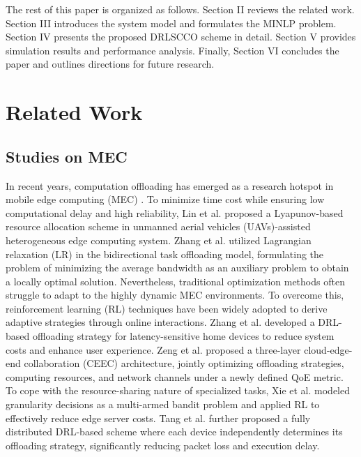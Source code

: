 \documentclass[lettersize,journal]{IEEEtran}
\begin{document}
The rest of this paper is organized as follows. Section II reviews the related work. Section III introduces the system model and formulates the MINLP problem. Section IV presents the proposed DRLSCCO scheme in detail. Section V provides simulation results and performance analysis. Finally, Section VI concludes the paper and outlines directions for future research.

\section{Related Work}
\subsection{Studies on MEC}
In recent years, computation offloading  has emerged as a research hotspot in mobile edge computing (MEC) \cite{Raeisi-VarzanehDakkak-23}.
% 
To minimize time cost while ensuring low computational delay and high reliability, Lin et al. \cite{LinHuang-24} proposed a Lyapunov-based resource allocation scheme in unmanned aerial vehicles (UAVs)-assisted heterogeneous edge computing system.
% 
Zhang et al. \cite{L-29} utilized  Lagrangian relaxation (LR) in the bidirectional task offloading model, formulating the problem of minimizing the average bandwidth as an auxiliary problem to obtain a locally optimal solution.
% 
Nevertheless, traditional optimization methods often struggle to adapt to the highly dynamic MEC environments. To overcome this, reinforcement learning (RL) techniques have been widely adopted to derive adaptive strategies through online interactions.
% 
Zhang et al. \cite{ZhangXia-25} developed  a DRL-based offloading strategy for latency-sensitive home devices to reduce system costs and enhance user experience.
% 
Zeng et al. \cite{ZengWang-26} proposed a three-layer cloud-edge-end collaboration (CEEC) architecture, jointly optimizing offloading strategies, computing resources, and network channels under a newly defined QoE metric.
% 
To cope with the resource-sharing nature of specialized tasks, Xie et al. \cite{XieFang-27} modeled granularity decisions as a multi-armed bandit problem and applied RL to effectively reduce edge server costs.
% 
Tang et al. \cite{TangWong-28} further proposed a fully distributed DRL-based scheme where each device independently determines its offloading strategy, significantly reducing packet loss and execution delay.
\end{document}

